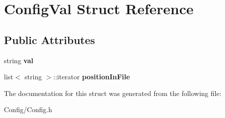 \hypertarget{struct_config_val}{\section{\-Config\-Val \-Struct \-Reference}
\label{struct_config_val}
}
\subsection*{\-Public \-Attributes}
\begin{DoxyCompactItemize}
\item 
\hypertarget{struct_config_val_a7ace719baff94cd3c4d8f41804949ae3}{string {\bfseries val}}\label{struct_config_val_a7ace719baff94cd3c4d8f41804949ae3}

\item 
\hypertarget{struct_config_val_a28edcf3f0dc74dda4daa8bb20f2d4400}{list$<$ string $>$\-::iterator {\bfseries position\-In\-File}}\label{struct_config_val_a28edcf3f0dc74dda4daa8bb20f2d4400}

\end{DoxyCompactItemize}


\-The documentation for this struct was generated from the following file\-:\begin{DoxyCompactItemize}
\item 
\-Config/\-Config.\-h\end{DoxyCompactItemize}
